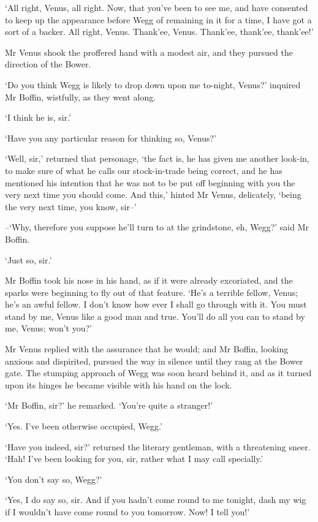 ‘All right, Venus, all right. Now, that you’ve been to see me, and have
consented to keep up the appearance before Wegg of remaining in it for a
time, I have got a sort of a backer. All right, Venus. Thank’ee, Venus.
Thank’ee, thank’ee, thank’ee!’

Mr Venus shook the proffered hand with a modest air, and they pursued
the direction of the Bower.

‘Do you think Wegg is likely to drop down upon me to-night, Venus?’
inquired Mr Boffin, wistfully, as they went along.

‘I think he is, sir.’

‘Have you any particular reason for thinking so, Venus?’

‘Well, sir,’ returned that personage, ‘the fact is, he has given me
another look-in, to make sure of what he calls our stock-in-trade being
correct, and he has mentioned his intention that he was not to be put
off beginning with you the very next time you should come. And this,’
hinted Mr Venus, delicately, ‘being the very next time, you know, sir--’

--‘Why, therefore you suppose he’ll turn to at the grindstone, eh,
Wegg?’ said Mr Boffin.

‘Just so, sir.’

Mr Boffin took his nose in his hand, as if it were already excoriated,
and the sparks were beginning to fly out of that feature. ‘He’s a
terrible fellow, Venus; he’s an awful fellow. I don’t know how ever I
shall go through with it. You must stand by me, Venus like a good man
and true. You’ll do all you can to stand by me, Venus; won’t you?’

Mr Venus replied with the assurance that he would; and Mr Boffin,
looking anxious and dispirited, pursued the way in silence until they
rang at the Bower gate. The stumping approach of Wegg was soon heard
behind it, and as it turned upon its hinges he became visible with his
hand on the lock.

‘Mr Boffin, sir?’ he remarked. ‘You’re quite a stranger!’

‘Yes. I’ve been otherwise occupied, Wegg.’

‘Have you indeed, sir?’ returned the literary gentleman, with a
threatening sneer. ‘Hah! I’ve been looking for you, sir, rather what I
may call specially.’

‘You don’t say so, Wegg?’

‘Yes, I do say so, sir. And if you hadn’t come round to me tonight, dash
my wig if I wouldn’t have come round to you tomorrow. Now! I tell you!’

